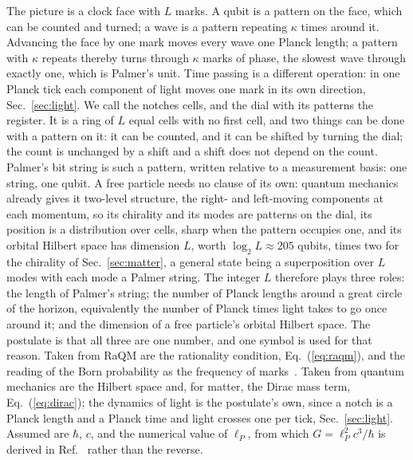 \documentclass[aps,prd,twocolumn,superscriptaddress,nofootinbib]{revtex4-2}
\begin{document}
The picture is a clock face with $L$ marks. A qubit is a pattern on the face, which can be counted and turned; a wave is a pattern repeating $\kappa$ times around it. Advancing the face by one mark moves every wave one Planck length; a pattern with $\kappa$ repeats thereby turns through $\kappa$ marks of phase, the slowest wave through exactly one, which is Palmer's unit. Time passing is a different operation: in one Planck tick each component of light moves one mark in its own direction, Sec.~\ref{sec:light}. We call the notches cells, and the dial with its patterns the register. It is a ring of $L$ equal cells with no first cell, and two things can be done with a pattern on it: it can be counted, and it can be shifted by turning the dial; the count is unchanged by a shift and a shift does not depend on the count. Palmer's bit string is such a pattern, written relative to a measurement basis: one string, one qubit. A free particle needs no clause of its own: quantum mechanics already gives it two-level structure, the right- and left-moving components at each momentum, so its chirality and its modes are patterns on the dial, its position is a distribution over cells, sharp when the pattern occupies one, and its orbital Hilbert space has dimension $L$, worth $\log_2L\approx205$ qubits, times two for the chirality of Sec.~\ref{sec:matter}, a general state being a superposition over $L$ modes with each mode a Palmer string. The integer $L$ therefore plays three roles: the length of Palmer's string; the number of Planck lengths around a great circle of the horizon, equivalently the number of Planck times light takes to go once around it; and the dimension of a free particle's orbital Hilbert space. The postulate is that all three are one number, and one symbol is used for that reason. Taken from RaQM are the rationality condition, Eq.~(\ref{eq:raqm}), and the reading of the Born probability as the frequency of marks~\cite{palmer2026}. Taken from quantum mechanics are the Hilbert space and, for matter, the Dirac mass term, Eq.~(\ref{eq:dirac}); the dynamics of light is the postulate's own, since a notch is a Planck length and a Planck time and light crosses one per tick, Sec.~\ref{sec:light}. Assumed are $\hbar$, $c$, and the numerical value of $\ell_P$, from which $G = \ell_P^2c^3/\hbar$ is derived in Ref.~\cite{korytko2026} rather than the reverse.
\end{document}
